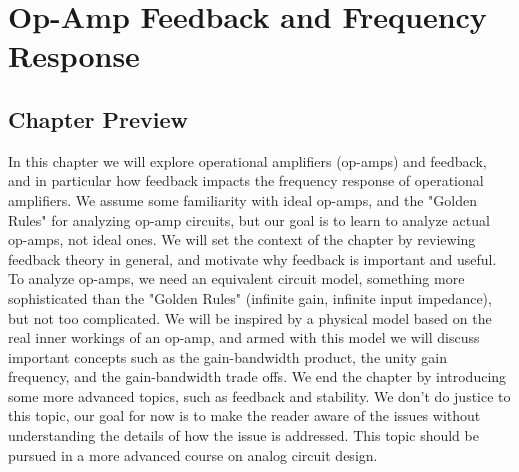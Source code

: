 \chapter{Op-Amp Feedback and Frequency Response}
\label{ch:ch17_opamps_fb}
\graphicspath{{./figs_opamps_fb/}}
\section{Chapter Preview}
In this chapter we will explore operational amplifiers (op-amps) and feedback, and in particular how feedback impacts the frequency response of operational amplifiers.  We assume some familiarity with ideal op-amps, and the "Golden Rules" for analyzing op-amp circuits, but our goal is to learn to analyze actual op-amps, not ideal ones.  We will set the context of the chapter by reviewing feedback theory in general, and motivate why feedback is important and useful.  To analyze op-amps, we need an equivalent circuit model, something more sophisticated than the "Golden Rules" (infinite gain, infinite input impedance), but not too complicated.   We will be inspired by a physical model based on the real inner workings of an op-amp, and armed with this model we will discuss important concepts such as the gain-bandwidth product, the unity gain frequency, and the gain-bandwidth trade offs.  We end the chapter by introducing some more advanced topics, such as feedback and stability.  We don't do justice to this topic, our goal for now is to make the reader aware of the issues without understanding the details of how the issue is addressed.  This topic should be pursued in a more advanced course on analog circuit design.
\newpage
